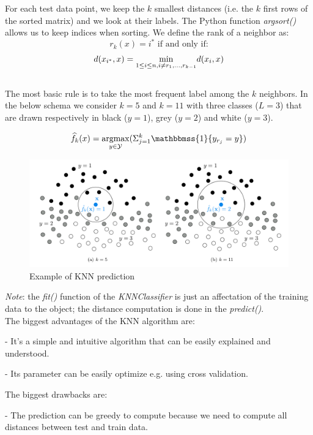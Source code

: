 For each test data point, we keep the $k$ smallest distances (i.e. the $k$ first rows of the sorted matrix) and we look at their labels. The Python function \textit{argsort()} allows us to keep indices when sorting. We define the rank of a neighbor as:  \\

$$r_k(x)=i^* \text{ if and only if:}$$ $$d(x_{i^*},x)=\underset{1 \le i \le n,~ \\
i \neq r_{1},...,r_{k-1}}{\operatorname{min}}d(x_i,x)$$ \\

The most basic rule is to take the most frequent label among the $k$ neighbors. In the below schema we consider $k=5$ and $k=11$ with three classes ($L=3$) that are drawn respectively in black ($y=1$), grey ($y=2$) and white ($y=3$).

$$\widehat{f}_k(x)=\underset{y \in \mathcal{Y}}{\operatorname{argmax}}(\Sigma_{j=1}^k \mathbbmss{1}\{y_{r_j}=y\})$$

\begin{figure}[h!]
\begin{center}
\includegraphics[scale=0.4]{KNN_pic.png}
\caption{Example of KNN prediction}
\end{center}
\end{figure}

\textit{Note}: the \textit{fit()} function of the \textit{KNNClassifier} is just an affectation of the training data to the object; the distance computation is done in the \textit{predict()}. \\

The biggest advantages of the KNN algorithm are:

- It's a simple and intuitive algorithm that can be easily explained and understood.

- Its parameter can be easily optimize e.g. using cross validation.

The biggest drawbacks are:

- The prediction can be greedy to compute because we need to compute all distances between test and train data.

